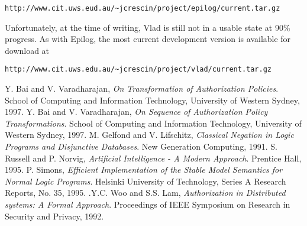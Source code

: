 \documentclass[a4paper,draft]{article}
\begin{document}
    \begin{verbatim}
http://www.cit.uws.eud.au/~jcrescin/project/epilog/current.tar.gz
    \end{verbatim}

    Unfortunately, at the time of writing, Vlad is still not in a usable state
    at 90\% progress. As with Epilog, the most current development version is
    available for download at

    \begin{verbatim}
http://www.cit.uws.edu.au/~jcrescin/project/vlad/current.tar.gz
    \end{verbatim}

    \pagebreak

  \begin{thebibliography}{}
    Y. Bai and V. Varadharajan, \emph{On Transformation of Authorization Policies}. School of Computing and Information Technology, University of Western Sydney, 1997.
    Y. Bai and V. Varadharajan, \emph{On Sequence of Authorization Policy Transformations}. School of Computing and Information Technology, University of Western Sydney, 1997.
    M. Gelfond and V. Lifschitz, \emph{Classical Negation in Logic Programs and Disjunctive Databases}. New Generation Computing, 1991.
    S. Russell and P. Norvig, \emph{Artificial Intelligence - A Modern Approach}. Prentice Hall, 1995.
    P. Simons, \emph{Efficient Implementation of the Stable Model Semantics for Normal Logic Programs}. Helsinki University of Technology, Series A Research Reports, No. 35, 1995.
    .Y.C. Woo and S.S. Lam, \emph{Authorization in Distributed systems: A Formal Approach}. Proceedings of IEEE Symposium on Research in Security and Privacy, 1992.
  \end{thebibliography}
\end{document}
